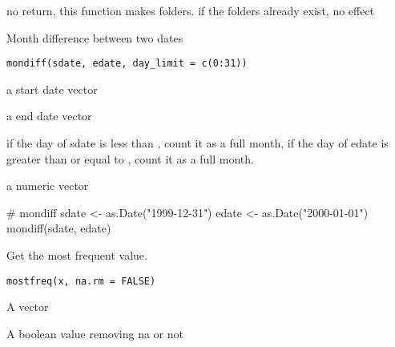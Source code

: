 \documentclass[letterpaper]{book}
\begin{document}
%
\begin{Value}
no return, this function makes folders. if the folders already exist,
no effect
\end{Value}
%
\begin{Description}
Month difference between two dates
\end{Description}
%
\begin{Usage}
\begin{verbatim}
mondiff(sdate, edate, day_limit = c(0:31))
\end{verbatim}
\end{Usage}
%
\begin{Arguments}
\begin{ldescription}
\item[\code{sdate}] a start date vector

\item[\code{edate}] a end date vector

\item[\code{day\_limit}] if the day of sdate is less than , count it as a
full month, if the day of edate is greater than or equal to ,
count it as a full month.
\end{ldescription}
\end{Arguments}
%
\begin{Value}
a numeric vector
\end{Value}
%
\begin{Examples}
\begin{ExampleCode}
# mondiff
sdate <- as.Date("1999-12-31")
edate <- as.Date("2000-01-01")
mondiff(sdate, edate)

\end{ExampleCode}
\end{Examples}
%
\begin{Description}
Get the most frequent value.
\end{Description}
%
\begin{Usage}
\begin{verbatim}
mostfreq(x, na.rm = FALSE)
\end{verbatim}
\end{Usage}
%
\begin{Arguments}
\begin{ldescription}
\item[\code{x}] A vector

\item[\code{na.rm}] A boolean value removing na or not
\end{ldescription}
\end{Arguments}
\end{document}
